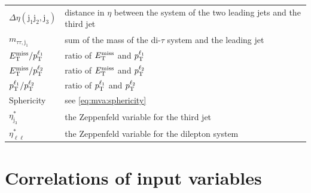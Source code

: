\begin{table}[htpb]
\begin{tabular}{ll}
    $\Delta \eta (\text{j}_1\text{j}_2,\text{j}_3)$ & distance in $\eta$ between the system of the two leading jets and the third jet \\
    $m_{\tau\tau,\text{j}_1}$ & sum of the mass of the di-$\tau$ system and the leading jet \\
    $E_\text{T}^\text{miss} / p_\text{T}^{\ell_1}$ & ratio of $E_\text{T}^\text{miss}$ and $p_\text{T}^{\ell_1}$ \\
    $E_\text{T}^\text{miss} / p_\text{T}^{\ell_2}$ & ratio of $E_\text{T}^\text{miss}$ and $p_\text{T}^{\ell_2}$ \\
    $p_\text{T}^{\ell_1}/ p_\text{T}^{\ell_2}$ & ratio of $p_\text{T}^{\ell_1}$ and $p_\text{T}^{\ell_2}$ \\
    Sphericity & see \cref{eq:mva:sphericity} \\
    $\eta^*_{\text{j}_3}$ & the Zeppenfeld variable for the third jet~\cite{Zeppenfeld} \\
    $\eta^*_{\ell\ell}$ & the Zeppenfeld variable for the dilepton system \\

    \bottomrule
    \end{tabular}
\end{table}

\section{Correlations of input variables}\label{app:mva:correlation_inputvars}

